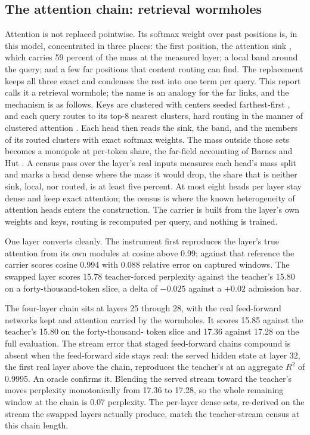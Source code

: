 \documentclass[11pt]{article}
\begin{document}
\subsection{The attention chain: retrieval wormholes}

Attention is not replaced pointwise. Its softmax weight over past
positions is, in this model, concentrated in three places: the
first position, the attention sink \cite{xiao2023}, which carries
59 percent of the mass at the measured layer; a local band around
the query; and a few far positions that content routing can find.
The replacement keeps all three exact and condenses the rest into
one term per query. This report calls it a retrieval wormhole; the
name is an analogy for the far links, and the mechanism is as
follows. Keys are clustered with centers seeded farthest-first
\cite{arthur2007}, and each query routes to its top-8 nearest
clusters, hard routing in the manner of clustered attention
\cite{vyas2020clustered}. Each head then reads the sink, the band,
and the members of its routed clusters with exact softmax weights.
The mass outside those sets becomes a monopole at per-token share,
the far-field accounting of Barnes and Hut \cite{barnes1986}. A
census pass over the layer's real inputs measures each head's mass
split and marks a head dense where the mass it would drop, the
share that is neither sink, local, nor routed, is at least five
percent. At most eight heads per layer stay dense and keep exact
attention; the census is where the known heterogeneity of attention
heads \cite{clark2019, voita2019} enters the construction. The
carrier is built from the layer's own weights and keys, routing is
recomputed per query, and nothing is trained.

One layer converts cleanly. The instrument first reproduces the
layer's true attention from its own modules at cosine above 0.99;
against that reference the carrier scores cosine 0.994 with 0.088
relative error on captured windows. The swapped layer scores 15.78
teacher-forced perplexity against the teacher's 15.80 on a
forty-thousand-token slice, a delta of $-0.025$ against a $+0.02$
admission bar.

The four-layer chain sits at layers 25 through 28, with the real
feed-forward networks kept and attention carried by the wormholes.
It scores 15.85 against the teacher's 15.80 on the forty-thousand-
token slice and 17.36 against 17.28 on the full evaluation. The
stream error that staged feed-forward chains compound is absent
when the feed-forward side stays real: the served hidden state at
layer 32, the first real layer above the chain, reproduces the
teacher's at an aggregate $R^2$ of 0.9995. An oracle confirms it.
Blending the served stream toward the teacher's moves perplexity
monotonically from 17.36 to 17.28, so the whole remaining window at
the chain is 0.07 perplexity. The per-layer dense sets, re-derived
on the stream the swapped layers actually produce, match the
teacher-stream census at this chain length.
\end{document}
